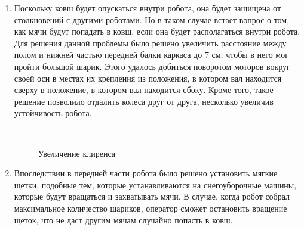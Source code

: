 \begin{enumerate}
\begin{enumerate}
      \item Поскольку ковш будет опускаться внутри робота, она будет защищена от столкновений с другими роботами. Но в таком случае встает вопрос о том, как мячи будут попадать в ковш, если она будет располагаться внутри робота. Для решения данной проблемы было решено увеличить расстояние между полом и нижней частью передней балки каркаса до 7 см, чтобы в него мог пройти большой шарик. Этого удалось добиться поворотом моторов вокруг своей оси в местах их крепления из положения, в котором вал находится сверху в положение, в котором вал находится сбоку. Кроме того, такое решение позволило отдалить колеса друг от друга, несколько увеличив устойчивость робота.
      
      \begin{figure}[H]
      	\begin{minipage}[h]{1\linewidth}
      		\caption{Увеличение клиренса} 
      	\end{minipage}
      \end{figure}
        
      \item Впоследствии в передней части робота было решено установить мягкие щетки, подобные тем, которые устанавливаются на снегоуборочные машины, которые будут вращаться и захватывать мячи. В случае, когда робот собрал максимальное количество шариков, оператор сможет остановить вращение щеток, что не даст другим мячам случайно попасть в ковш.
      

\end{enumerate}
\end{enumerate}
